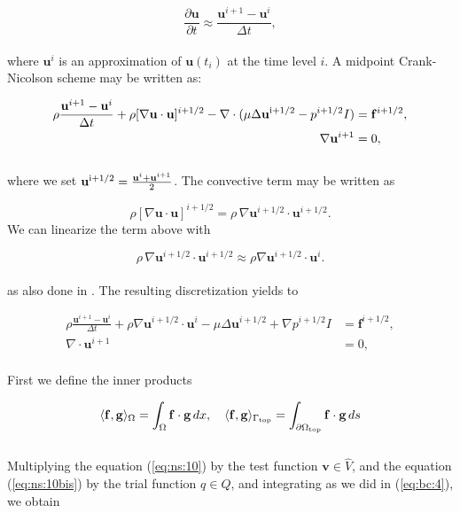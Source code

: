 \documentclass[a4paper,11pt,oneside]{book}
\begin{document}
\begin{equation}
\frac{\partial \mathbf{u}}{\partial t} \approx \frac{\mathbf{u}^{i+1} -\mathbf{u}^i }{\Delta t},
\end{equation}
\\
where $\mathbf{u}^i$ is an approximation of $\mathbf{u}(t_i)$ at the time level $i$. A midpoint Crank-Nicolson scheme may be written as:

\begin{align}
\rho \frac{\mathbf{u}^{i+1} - \mathbf{u}^i}{\Delta t} + \rho [\nabla \mathbf{u} \cdot \mathbf{u}]^{i+1/2} - \nabla \cdot (\mu \Delta \mathbf{u}^{\rm  i+1/2} - p^{i+1/2}I) &= \mathbf{f}^{i+1/2}, \\
\nabla \mathbf{u}^{i+1} &= 0,
\end{align}
\\
where we set $\mathbf{u}^{\rm i+1/2} = \frac{\mathbf{u}^i + \mathbf{u}^{i+1}}{2}$.
The convective term may be written as

\begin{equation}
\rho [\nabla \mathbf{u} \cdot \mathbf{u}]^{i+1/2} = \rho \, \nabla \mathbf{u}^{i+1/2} \cdot \mathbf{u}^{i+1/2}.
\end{equation}
We can linearize the term above with

\begin{equation}
\rho \, \nabla \mathbf{u}^{i+1/2} \cdot \mathbf{u}^{i+1/2} \approx \rho \nabla \mathbf{u}^{i+1/2} \cdot \mathbf{u}^i.
\end{equation}
\\
as also done in \cite{logg}. The resulting discretization yields to

\begin{align}
\label{eq:ns:10}
\rho \frac{\mathbf{u}^{i+1} - \mathbf{u}^i}{\Delta t} + \rho \nabla \mathbf{u}^{i+1/2} \cdot \mathbf{u}^i - \mu \Delta \mathbf{u}^{i+1/2} + \nabla p^{i+1/2}I &= \mathbf{f}^{i+1/2}, \\
\label{eq:ns:10bis}
\nabla \cdot \mathbf{u}^{i+1} &= 0,
\end{align}
\\
First we define the inner products

\[
\langle \mathbf{f}, \mathbf{g} \rangle_\Omega = \int_\Omega \mathbf{f} \cdot \mathbf{g} \, dx, \quad
\langle \mathbf{f}, \mathbf{g} \rangle_{\Gamma_{\rm top}} = \int_{\partial \Omega_{\rm top}} \mathbf{f} \cdot \mathbf{g} \, ds
\]
\\
Multiplying the equation (\ref{eq:ns:10}) by the test function $\mathbf{v} \in \hat{V}$, and the equation (\ref{eq:ns:10bis}) by the trial function $q \in Q$, and integrating as we did in (\ref{eq:bc:4}), we obtain 
\end{document}
